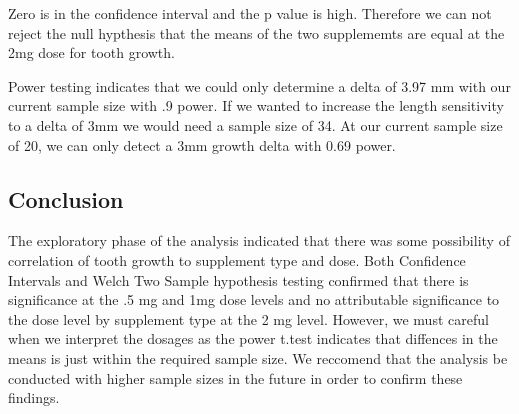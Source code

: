 \documentclass[]{article}
\begin{document}
Zero is in the confidence interval and the p value is high. Therefore we
can not reject the null hypthesis that the means of the two supplememts
are equal at the 2mg dose for tooth growth.

Power testing indicates that we could only determine a delta of 3.97 mm
with our current sample size with .9 power. If we wanted to increase the
length sensitivity to a delta of 3mm we would need a sample size of 34.
At our current sample size of 20, we can only detect a 3mm growth delta
with 0.69 power.

\hypertarget{conclusion}{%
\subsection{Conclusion}\label{conclusion}}

The exploratory phase of the analysis indicated that there was some
possibility of correlation of tooth growth to supplement type and dose.
Both Confidence Intervals and Welch Two Sample hypothesis testing
confirmed that there is significance at the .5 mg and 1mg dose levels
and no attributable significance to the dose level by supplement type at
the 2 mg level. However, we must careful when we interpret the dosages
as the power t.test indicates that diffences in the means is just within
the required sample size. We reccomend that the analysis be conducted
with higher sample sizes in the future in order to confirm these
findings.
\end{document}
